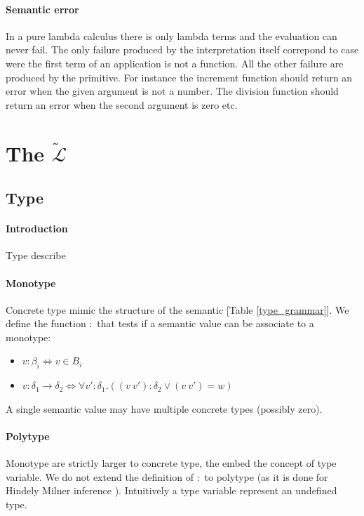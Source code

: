 \documentclass[a4paper]{report}
\newcommand{\lang}[0]{\mathcal{L}}
\newcommand{\locus}[1]{\widetilde{#1}}
\newcommand{\reftab}[1]{[Table \ref{#1}]}
\begin{document}
\paragraph{Semantic error} In a pure lambda calculus there is only lambda terms and the evaluation can never fail. The only failure produced by the interpretation itself correpond to case were the first term of an application is not a function. All the other failure are produced by the primitive. For instance the increment function should return an error when the given argument is not a number. The division function should return an error when the second argument is zero etc.

\section{The $\locus{\lang}$}

\subsection{Type}

\paragraph{Introduction} Type describe

\paragraph{Monotype} Concrete type mimic the structure of the semantic \reftab{type_grammar}. We define the function $:$ that tests if a semantic value can be associate to a monotype:
\begin{itemize}
\item $v:\beta_i\Leftrightarrow v\in B_i$
\item $v:\delta_1\to\delta_2\Leftrightarrow \forall v':\delta_1.((v\ v'):\delta_2\vee (v\ v')=w)$
\end{itemize}
A single semantic value may have multiple concrete types (possibly zero).

\paragraph{Polytype} Monotype are strictly larger to concrete type, the embed the concept of type variable. We do not extend the definition of $:$ to polytype (as it is done for Hindely Milner inference \cite{hm2}). Intuitively a type variable represent an undefined type.
\end{document}
